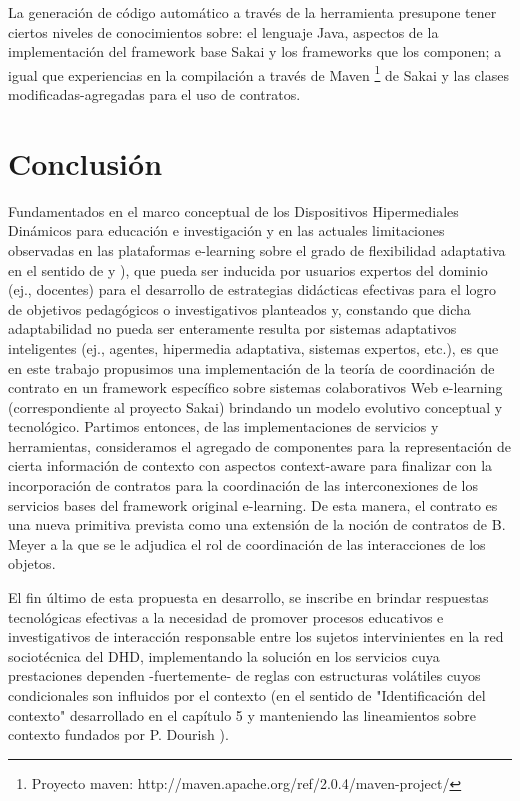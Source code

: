 La generación de código automático a través de la herramienta presupone tener
ciertos niveles de conocimientos sobre: el lenguaje Java, aspectos de la
implementación del framework base Sakai y los frameworks que los componen; a
igual que experiencias en la compilación a través de Maven \footnote{Proyecto
maven: http://maven.apache.org/ref/2.0.4/maven-project/} de Sakai y las clases
modificadas-agregadas para el uso de contratos.

\section {Conclusión}

Fundamentados en el marco conceptual de los Dispositivos Hipermediales Dinámicos
para educación e investigación y en las actuales limitaciones observadas en las
plataformas e-learning sobre el grado de flexibilidad adaptativa en el sentido
de \cite{adaptativa} y \cite{kcomponent}), que pueda ser inducida por usuarios
expertos del dominio (ej., docentes) para el desarrollo de estrategias
didácticas efectivas para el logro de objetivos pedagógicos o investigativos 
planteados y, constando que dicha adaptabilidad no pueda ser enteramente resulta
por sistemas adaptativos inteligentes (ej., agentes, hipermedia adaptativa,
sistemas expertos, etc.), es que en este trabajo propusimos una implementación
de la teoría de coordinación de contrato en un framework específico sobre
sistemas colaborativos Web e-learning (correspondiente al proyecto Sakai)
brindando un modelo evolutivo conceptual y tecnológico. 
Partimos entonces, de las implementaciones de servicios y herramientas,
consideramos el agregado de componentes para la representación de cierta
información de contexto con aspectos context-aware para finalizar con la
incorporación de contratos para la coordinación de las interconexiones de los
servicios bases del framework original e-learning. De esta manera, el contrato
es una nueva primitiva prevista como una extensión de la noción de contratos de
B. Meyer \cite{Meyer} a la que se le adjudica el rol de coordinación de las
interacciones de los objetos.

El fin último de esta propuesta en desarrollo, se inscribe en brindar respuestas
tecnológicas efectivas a la necesidad de promover procesos educativos e
investigativos de interacción responsable entre los sujetos intervinientes en la
red sociotécnica del DHD, implementando la solución en los servicios cuya
prestaciones dependen -fuertemente- de reglas con estructuras volátiles cuyos
condicionales son influidos por el contexto (en el sentido de "Identificación
del contexto" desarrollado en el capítulo 5 \cite{libro} y manteniendo las
lineamientos sobre contexto fundados por P. Dourish \cite{contexto}). 

